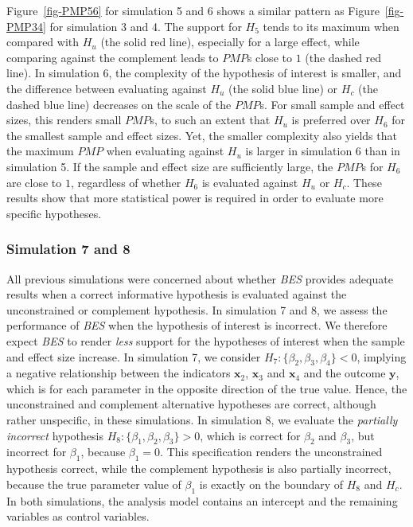 \documentclass[
]{interact}
\begin{document}
Figure~\ref{fig-PMP56} for simulation 5 and 6 shows a similar pattern as
Figure~\ref{fig-PMP34} for simulation 3 and 4. The support for \(H_5\)
tends to its maximum when compared with \(H_u\) (the solid red line),
especially for a large effect, while comparing against the complement
leads to \(PMP\)s close to \(1\) (the dashed red line). In simulation 6,
the complexity of the hypothesis of interest is smaller, and the
difference between evaluating against \(H_u\) (the solid blue line) or
\(H_c\) (the dashed blue line) decreases on the scale of the \(PMP\)s.
For small sample and effect sizes, this renders small \(PMP\)s, to such
an extent that \(H_u\) is preferred over \(H_6\) for the smallest sample
and effect sizes. Yet, the smaller complexity also yields that the
maximum \(PMP\) when evaluating against \(H_u\) is larger in simulation
6 than in simulation 5. If the sample and effect size are sufficiently
large, the \(PMP\)s for \(H_6\) are close to \(1\), regardless of
whether \(H_6\) is evaluated against \(H_u\) or \(H_c\). These results
show that more statistical power is required in order to evaluate more
specific hypotheses.

\hypertarget{simulation-7-and-8}{%
\subsubsection{Simulation 7 and 8}\label{simulation-7-and-8}}

All previous simulations were concerned about whether \emph{BES}
provides adequate results when a correct informative hypothesis is
evaluated against the unconstrained or complement hypothesis. In
simulation 7 and 8, we assess the performance of \emph{BES} when the
hypothesis of interest is incorrect. We therefore expect \emph{BES} to
render \emph{less} support for the hypotheses of interest when the
sample and effect size increase. In simulation 7, we consider
\(H_7: \{\beta_2, \beta_3, \beta_4\} < 0\), implying a negative
relationship between the indicators \(\boldsymbol{x}_2\),
\(\boldsymbol{x}_3\) and \(\boldsymbol{x}_4\) and the outcome
\(\boldsymbol{y}\), which is for each parameter in the opposite
direction of the true value. Hence, the unconstrained and complement
alternative hypotheses are correct, although rather unspecific, in these
simulations. In simulation 8, we evaluate the \emph{partially incorrect}
hypothesis \(H_8: \{\beta_1, \beta_2, \beta_3\} > 0\), which is correct
for \(\beta_2\) and \(\beta_3\), but incorrect for \(\beta_1\), because
\(\beta_1 = 0\). This specification renders the unconstrained hypothesis
correct, while the complement hypothesis is also partially incorrect,
because the true parameter value of \(\beta_1\) is exactly on the
boundary of \(H_8\) and \(H_c\). In both simulations, the analysis model
contains an intercept and the remaining variables as control variables.
\end{document}
